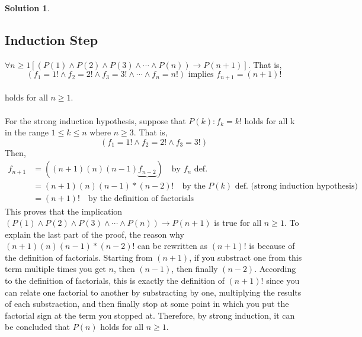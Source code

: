 \documentclass{article}
\theoremstyle{definition}
\newtheorem*{solution}{Solution}
\begin{document}
\begin{solution}
\subsection*{Induction Step}
$\forall n \geqslant 1[(P(1) \land P(2) \land P(3) \land \cdots \land P(n)) \rightarrow P(n+1)]$. That is,\\
$$ (f_1 = 1! \land f_2 = 2! \land f_3 = 3! \land \cdots \land f_n = n!) \mbox{ implies } f_{n+1} = (n+1)! $$\\ holds for all $n \geqslant 1$.\\\\
For the strong induction hypothesis, suppose that $P(k): f_k = k!$ holds for all k in the range $1 \leqslant k \leqslant n$ where $n \geqslant 3$. That is,\\
$$(f_1 = 1! \land f_2 = 2! \land f_3 = 3!)$$Then,
\begin{align*}
f_{n+1} &= ((n+1)(n)(n-1)\underbrace{f_{n-2}})\quad \mbox{by $f_n$ def.}\\
&= (n+1)(n)(n-1)*(n-2)! \quad \mbox{by the $P(k)$ def. (strong induction hypothesis)}\\
&= (n+1)! \quad \mbox{by the definition of factorials}
\end{align*}
This proves that the implication $(P(1) \land P(2) \land P(3) \land \cdots \land P(n)) \rightarrow P(n+1)$ is true for all $n \geqslant 1$. To explain the last part of the proof, the reason why $(n+1)(n)(n-1)*(n-2)!$ can be rewritten as $(n+1)!$ is because of the definition of factorials. Starting from $(n+1)$, if you substract one from this term multiple times you get $n$, then $(n-1)$, then finally $(n-2)$. According to the definition of factorials, this is exactly the definition of $(n+1)!$ since you can relate one factorial to another by substracting by one, multiplying the results of each substraction, and then finally stop at some point in which you put the factorial sign at the term you stopped at. Therefore, by strong induction, it can be concluded that $P(n)$ holds for all $n \geqslant 1$.
\end{solution}
\end{document}
